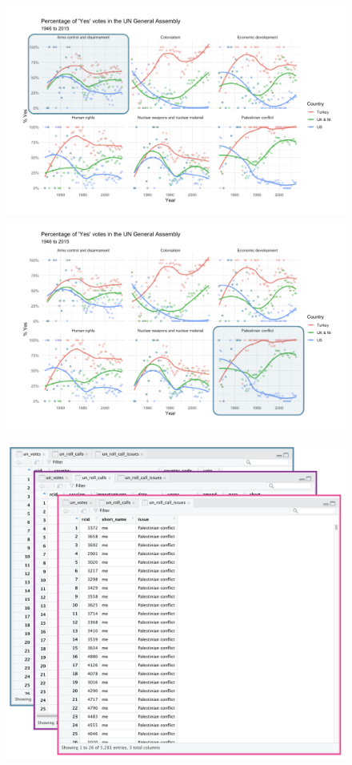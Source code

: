 \documentclass[11pt]{beamer}
\begin{document}
\begin{frame}
\begin{figure}
\begin{overprint}
		\centering\includegraphics[width=0.9\linewidth]{Images/S1/unvotes/unvotes-04}
		\onslide<5>\centering\includegraphics[width=0.9\linewidth]{Images/S1/unvotes/unvotes-05}	
	\end{overprint}
\end{figure}

\end{frame}

	
	\begin{frame}
	\begin{figure}
		\centering
		\includegraphics[width=0.5\linewidth]{Images/S1/unvotes/unvotes-07}
		\label{fig:unvotes-07}
	\end{figure}
	
	\end{frame}
	
\end{document}
